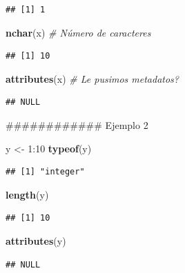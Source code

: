 \documentclass[]{article}
\newenvironment{Shaded}{\begin{snugshade}}{\end{snugshade}}
\newcommand{\KeywordTok}[1]{\textcolor[rgb]{0.13,0.29,0.53}{\textbf{{#1}}}}
\newcommand{\DecValTok}[1]{\textcolor[rgb]{0.00,0.00,0.81}{{#1}}}
\newcommand{\StringTok}[1]{\textcolor[rgb]{0.31,0.60,0.02}{{#1}}}
\newcommand{\CommentTok}[1]{\textcolor[rgb]{0.56,0.35,0.01}{\textit{{#1}}}}
\newcommand{\NormalTok}[1]{{#1}}
\begin{document}
\begin{verbatim}
## [1] 1
\end{verbatim}

\begin{Shaded}
\begin{Highlighting}[]
\KeywordTok{nchar}\NormalTok{(x) }\CommentTok{# Número de caracteres}
\end{Highlighting}
\end{Shaded}

\begin{verbatim}
## [1] 10
\end{verbatim}

\begin{Shaded}
\begin{Highlighting}[]
\KeywordTok{attributes}\NormalTok{(x) }\CommentTok{# Le pusimos metadatos?}
\end{Highlighting}
\end{Shaded}

\begin{verbatim}
## NULL
\end{verbatim}

\begin{Shaded}
\begin{Highlighting}[]
\NormalTok{############ Ejemplo 2}

\NormalTok{y <-}\StringTok{ }\DecValTok{1}\NormalTok{:}\DecValTok{10}
\KeywordTok{typeof}\NormalTok{(y)}
\end{Highlighting}
\end{Shaded}

\begin{verbatim}
## [1] "integer"
\end{verbatim}

\begin{Shaded}
\begin{Highlighting}[]
\KeywordTok{length}\NormalTok{(y)}
\end{Highlighting}
\end{Shaded}

\begin{verbatim}
## [1] 10
\end{verbatim}

\begin{Shaded}
\begin{Highlighting}[]
\KeywordTok{attributes}\NormalTok{(y)}
\end{Highlighting}
\end{Shaded}

\begin{verbatim}
## NULL
\end{verbatim}
\end{document}
